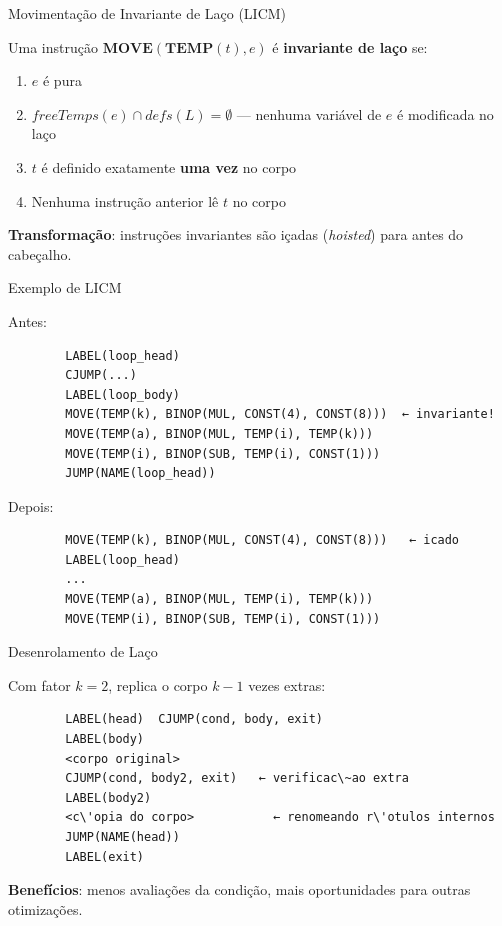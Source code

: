\begin{frame}{Movimentação de Invariante de Laço (LICM)}

    Uma instrução \(\mathbf{MOVE}(\mathbf{TEMP}(t), e)\) é
    \textbf{invariante de laço} se:

    \begin{enumerate}

        \item
        \(e\) é pura
        \item
        \(\mathit{freeTemps}(e) \cap \mathit{defs}(L) = \emptyset\) ---
        nenhuma variável de \(e\) é modificada no laço
        \item
        \(t\) é definido exatamente \textbf{uma vez} no corpo
        \item
        Nenhuma instrução anterior lê \(t\) no corpo
    \end{enumerate}

    \textbf{Transformação}: instruções invariantes são içadas
    (\emph{hoisted}) para antes do cabeçalho.
\end{frame}

\begin{frame}[fragile]{Exemplo de LICM}

    Antes:

    \begin{lstlisting}
        LABEL(loop_head)
        CJUMP(...)
        LABEL(loop_body)
        MOVE(TEMP(k), BINOP(MUL, CONST(4), CONST(8)))  ← invariante!
        MOVE(TEMP(a), BINOP(MUL, TEMP(i), TEMP(k)))
        MOVE(TEMP(i), BINOP(SUB, TEMP(i), CONST(1)))
        JUMP(NAME(loop_head))
    \end{lstlisting}

    Depois:

    \begin{lstlisting}
        MOVE(TEMP(k), BINOP(MUL, CONST(4), CONST(8)))   ← icado
        LABEL(loop_head)
        ...
        MOVE(TEMP(a), BINOP(MUL, TEMP(i), TEMP(k)))
        MOVE(TEMP(i), BINOP(SUB, TEMP(i), CONST(1)))
    \end{lstlisting}
\end{frame}

\begin{frame}[fragile]{Desenrolamento de Laço}

    Com fator \(k = 2\), replica o corpo \(k-1\) vezes extras:

    \begin{lstlisting}
        LABEL(head)  CJUMP(cond, body, exit)
        LABEL(body)
        <corpo original>
        CJUMP(cond, body2, exit)   ← verificac\~ao extra
        LABEL(body2)
        <c\'opia do corpo>           ← renomeando r\'otulos internos
        JUMP(NAME(head))
        LABEL(exit)
    \end{lstlisting}

    \textbf{Benefícios}: menos avaliações da condição, mais oportunidades
    para outras otimizações.
\end{frame}

